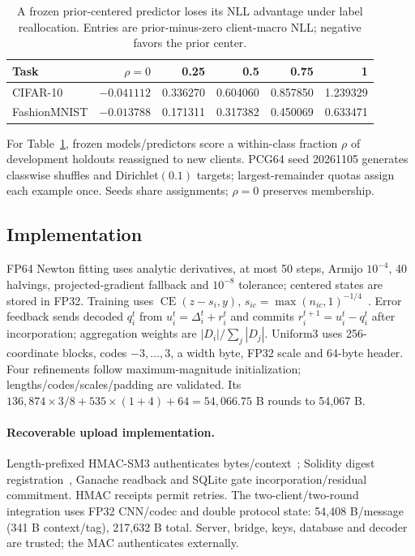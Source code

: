 \begin{table}[!htb]\centering\small
\caption{A frozen prior-centered predictor loses its NLL advantage under label reallocation. Entries are prior-minus-zero client-macro NLL; negative favors the prior center.}\label{tab:drift}
\begin{tabular}{lrrrrr}\toprule
Task & $\rho=0$ & 0.25 & 0.5 & 0.75 & 1\\\midrule
CIFAR-10 & $-0.041112$ & 0.336270 & 0.604060 & 0.857850 & 1.239329\\
FashionMNIST & $-0.013788$ & 0.171311 & 0.317382 & 0.450069 & 0.633471\\\bottomrule
\end{tabular}\end{table}
For Table~\ref{tab:drift}, frozen models/predictors score a within-class fraction $\rho$ of development holdouts reassigned to new clients. PCG64 seed 20261105 generates classwise shuffles and Dirichlet$(0.1)$ targets; largest-remainder quotas assign each example once. Seeds share assignments; $\rho=0$ preserves membership.

\subsection*{Implementation}\label{app:implementation}
FP64 Newton fitting uses analytic derivatives, at most 50 steps, Armijo $10^{-4}$, 40 halvings, projected-gradient fallback and $10^{-8}$ tolerance; centered states are stored in FP32. Training uses $\operatorname{CE}(z-s_i,y)$, $s_{ic}=\max(n_{ic},1)^{-1/4}$~\cite{zhang2022fedlc}. Error feedback sends decoded $q_i^t$ from $u_i^t=\Delta_i^t+r_i^t$ and commits $r_i^{t+1}=u_i^t-q_i^t$ after incorporation; aggregation weights are $|D_i|/\sum_j|D_j|$. Uniform3 uses 256-coordinate blocks, codes $-3,\ldots,3$, a width byte, FP32 scale and 64-byte header. Four refinements follow maximum-magnitude initialization; lengths/codes/scales/padding are validated. Its $136{,}874\times3/8+535\times(1+4)+64=54{,}066.75$ B rounds to 54,067 B.

\paragraph{Recoverable upload implementation.}
Length-prefixed HMAC-SM3 authenticates bytes/context~\cite{rfc2104,shen2018sm3}; Solidity digest registration~\cite{kim2020blockfl}, Ganache readback and SQLite gate incorporation/residual commitment. HMAC receipts permit retries. The two-client/two-round integration uses FP32 CNN/codec and double protocol state: 54,408 B/message (341 B context/tag), 217,632 B total. Server, bridge, keys, database and decoder are trusted; the MAC authenticates externally.